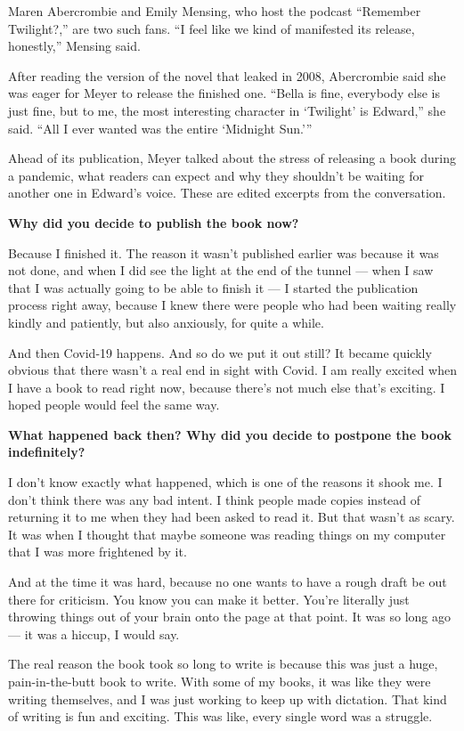 Maren Abercrombie and Emily Mensing, who host the podcast ``Remember
Twilight?,'' are two such fans. ``I feel like we kind of manifested its
release, honestly,'' Mensing said.

After reading the version of the novel that leaked in 2008, Abercrombie
said she was eager for Meyer to release the finished one. ``Bella is
fine, everybody else is just fine, but to me, the most interesting
character in `Twilight' is Edward,'' she said. ``All I ever wanted was
the entire `Midnight Sun.'''

Ahead of its publication, Meyer talked about the stress of releasing a
book during a pandemic, what readers can expect and why they shouldn't
be waiting for another one in Edward's voice. These are edited excerpts
from the conversation.

\textbf{Why did you decide to publish the book now?}

Because I finished it. The reason it wasn't published earlier was
because it was not done, and when I did see the light at the end of the
tunnel --- when I saw that I was actually going to be able to finish it
--- I started the publication process right away, because I knew there
were people who had been waiting really kindly and patiently, but also
anxiously, for quite a while.

And then Covid-19 happens. And so do we put it out still? It became
quickly obvious that there wasn't a real end in sight with Covid. I am
really excited when I have a book to read right now, because there's not
much else that's exciting. I hoped people would feel the same way.

\textbf{What happened back then? Why did you decide to postpone the book
indefinitely?}

I don't know exactly what happened, which is one of the reasons it shook
me. I don't think there was any bad intent. I think people made copies
instead of returning it to me when they had been asked to read it. But
that wasn't as scary. It was when I thought that maybe someone was
reading things on my computer that I was more frightened by it.

And at the time it was hard, because no one wants to have a rough draft
be out there for criticism. You know you can make it better. You're
literally just throwing things out of your brain onto the page at that
point. It was so long ago --- it was a hiccup, I would say.

The real reason the book took so long to write is because this was just
a huge, pain-in-the-butt book to write. With some of my books, it was
like they were writing themselves, and I was just working to keep up
with dictation. That kind of writing is fun and exciting. This was like,
every single word was a struggle.


